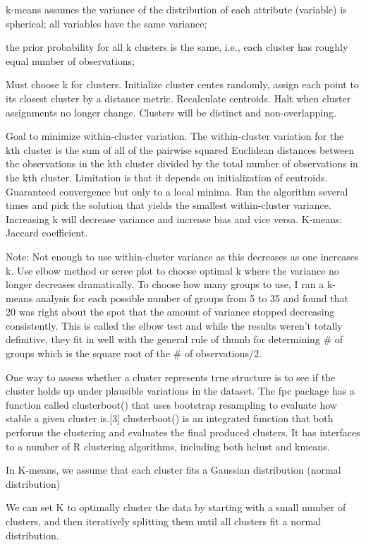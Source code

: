 \documentclass[]{book}
\begin{document}
k-means assumes the variance of the distribution of each attribute
(variable) is spherical; all variables have the same variance;

the prior probability for all k clusters is the same, i.e., each cluster
has roughly equal number of observations;

Must choose k for clusters. Initialize cluster centes randomly, assign
each point to its closest cluster by a distance metric. Recalculate
centroids. Halt when cluster assignments no longer change. Clusters will
be distinct and non-overlapping.

Goal to minimize within-cluster variation. The within-cluster variation
for the kth cluster is the sum of all of the pairwise squared Euclidean
distances between the observations in the kth cluster divided by the
total number of observations in the kth cluster. Limitation is that it
depends on initialization of centroids. Guaranteed convergence but only
to a local minima. Run the algorithm several times and pick the solution
that yields the smallest within-cluster variance. Increasing k will
decrease variance and increase bias and vice versa. K-means: Jaccard
coefficient.

Note: Not enough to use within-cluster variance as this decreases as one
increases k. Use elbow method or scree plot to choose optimal k where
the variance no longer decreases dramatically. To choose how many groups
to use, I ran a k-means analysis for each possible number of groups from
5 to 35 and found that 20 was right about the spot that the amount of
variance stopped decreasing consistently. This is called the elbow test
and while the results weren't totally definitive, they fit in well with
the general rule of thumb for determining \# of groups which is the
square root of the \# of observations/2.

One way to assess whether a cluster represents true structure is to see
if the cluster holds up under plausible variations in the dataset. The
fpc package has a function called clusterboot() that uses bootstrap
resampling to evaluate how stable a given cluster is.{[}3{]}
clusterboot() is an integrated function that both performs the
clustering and evaluates the final produced clusters. It has interfaces
to a number of R clustering algorithms, including both hclust and
kmeans.

In K-means, we assume that each cluster fits a Gaussian distribution
(normal distribution)

We can set K to optimally cluster the data by starting with a small
number of clusters, and then iteratively splitting them until all
clusters fit a normal distribution.
\end{document}
